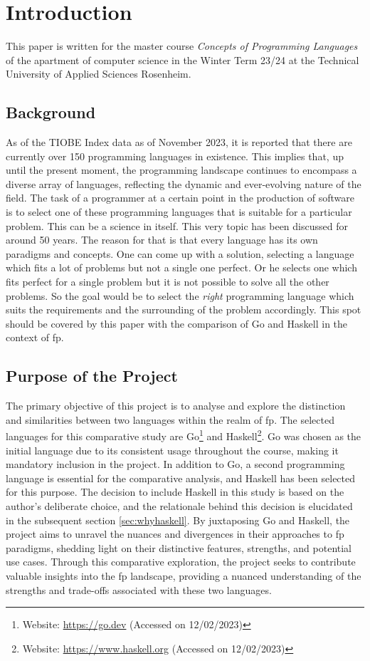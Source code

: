 \chapter{Introduction}\label{chap:introduction}
This paper is written for the master course \textit{Concepts of Programming Languages} of the apartment of computer science in the Winter Term 23/24 at the Technical University of Applied Sciences Rosenheim.
    \section{Background}\label{sec:background}
As of the TIOBE Index data as of November 2023, it is reported that there are currently over 150 programming languages in existence. This implies that, up until the present moment, the programming landscape continues to encompass a diverse array of languages, reflecting the dynamic and ever-evolving nature of the field.\cite{tiobeindex} The task of a programmer at a certain point in the production of software is to select one of these programming languages that is suitable for a particular problem. This can be a science in itself. This very topic has been discussed for around 50 years.\cite{Tharp1982}
The reason for that is that every language has its own paradigms and concepts. One can come up with a solution, selecting a language which fits a lot of problems but not a single one perfect. Or he selects one which fits perfect for a single problem but it is not possible to solve all the other problems.
So the goal would be to select the \textit{right} programming language which suits the requirements and the surrounding of the problem accordingly.
This spot should be covered by this paper with the comparison of Go and Haskell in the context of \ac{fp}.

    \section{Purpose of the Project}\label{sec:purpose}
    The primary objective of this project is to analyse and explore the distinction and similarities between two languages within the realm of \ac{fp}. The selected languages for this comparative study are Go\footnote{Website: \url{https://go.dev} (Accessed on 12/02/2023)} and Haskell\footnote{Website: \url{https://www.haskell.org} (Accessed on 12/02/2023)}. Go was chosen as the initial language due to its consistent usage throughout the course, making it mandatory inclusion in the project. 
    In addition to Go, a second programming language is essential for the comparative analysis, and Haskell has been selected for this purpose. The decision to include Haskell in this study is based on the author's deliberate choice, and the relationale behind this decision is elucidated in the subsequent section \ref{sec:whyhaskell}. By juxtaposing Go and Haskell, the project aims to unravel the nuances and divergences in their approaches to \ac{fp} paradigms, shedding light on their distinctive features, strengths, and potential use cases. Through this comparative exploration, the project seeks to contribute valuable insights into the \ac{fp} landscape, providing a nuanced understanding of the strengths and trade-offs associated with these two languages.

